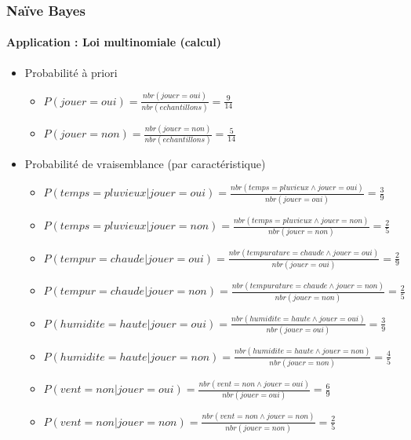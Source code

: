 \documentclass[xcolor=table]{beamer}
\begin{document}
\begin{frame}
	\frametitle{Naïve Bayes}
	\framesubtitle{Application : Loi multinomiale (calcul)}
	
	\begin{itemize}
		\item Probabilité à priori
		\begin{itemize}
			\item $P(jouer=oui) = \frac{nbr(jouer = oui)}{nbr(echantillons)} = \frac{9}{14}$
			\item $P(jouer=non) = \frac{nbr(jouer = non)}{nbr(echantillons)} = \frac{5}{14}$
		\end{itemize}
	\item Probabilité de vraisemblance (par caractéristique)
	\begin{itemize}
		\item $P(temps=pluvieux|jouer=oui) = \frac{nbr(temps=pluvieux \wedge jouer=oui)}{nbr(jouer=oui)} = \frac{3}{9}$
		\item $P(temps=pluvieux|jouer=non) = \frac{nbr(temps=pluvieux \wedge jouer=non)}{nbr(jouer=non)} = \frac{2}{5}$
		\item $P(tempur=chaude|jouer=oui) = \frac{nbr(tempurature=chaude \wedge jouer=oui)}{nbr(jouer=oui)} = \frac{2}{9}$
		\item $P(tempur=chaude|jouer=non) = \frac{nbr(tempurature=chaude \wedge jouer=non)}{nbr(jouer=non)} = \frac{2}{5}$
		\item $P(humidite=haute|jouer=oui) = \frac{nbr(humidite=haute \wedge jouer=oui)}{nbr(jouer=oui)} = \frac{3}{9}$
		\item $P(humidite=haute|jouer=non) = \frac{nbr(humidite=haute \wedge jouer=non)}{nbr(jouer=non)} = \frac{4}{5}$
		\item $P(vent=non|jouer=oui) = \frac{nbr(vent=non \wedge jouer=oui)}{nbr(jouer=oui)} = \frac{6}{9}$
		\item $P(vent=non|jouer=non) = \frac{nbr(vent=non \wedge jouer=non)}{nbr(jouer=non)} = \frac{2}{5}$
	\end{itemize}
	\end{itemize}
	
	
\end{frame}
\end{document}
